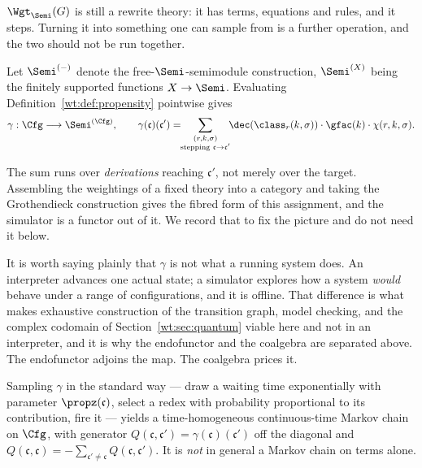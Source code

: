 $\Wgt_{\Semi}(G)$ is still a rewrite theory: it has terms, equations and rules, and it
steps. Turning it into something one can sample from is a further operation, and the two
should not be run together.

\begin{definition}
\label{wt:def:coalgebra}
Let $\Semi^{(-)}$ denote the free-$\Semi$-semimodule construction, $\Semi^{(X)}$ being the
finitely supported functions $X \to \Semi$. Evaluating
Definition~\ref{wt:def:propensity} pointwise gives
\[
  \gamma : \Cfg \longrightarrow \Semi^{(\Cfg)},
  \qquad
  \gamma(\mathfrak{c})(\mathfrak{c}')
  = \!\!\sum_{\substack{(r,k,\sigma) \\ \text{stepping } \mathfrak{c} \to \mathfrak{c}'}}\!\!
    \dec(\class_r(k,\sigma)) \cdot \gfac(k) \cdot \chi(r,k,\sigma).
\]
\end{definition}

The sum runs over \emph{derivations} reaching $\mathfrak{c}'$, not merely over the target.
Assembling the weightings of a fixed theory into a category and taking the Grothendieck
construction gives the fibred form of this assignment, and the simulator is a functor out
of it. We record that to fix the picture and do not need it below.

\begin{remark}
\label{wt:rmk:simulator}
It is worth saying plainly that $\gamma$ is not what a running system does.
An interpreter advances one actual state; a simulator explores how a system \emph{would}
behave under a range of configurations, and it is offline. That difference is what makes
exhaustive construction of the transition graph, model checking, and the complex codomain
of Section~\ref{wt:sec:quantum} viable here and not in an interpreter, and it is why the
endofunctor and the coalgebra are separated above. The endofunctor adjoins the map. The
coalgebra prices it.
\end{remark}

\begin{theorem}
\label{wt:thm:markov}
Sampling $\gamma$ in the standard way --- draw a waiting time exponentially with parameter
$\propz(\mathfrak{c})$, select a redex with probability proportional to its contribution,
fire it --- yields a time-homogeneous continuous-time Markov chain on $\Cfg$, with
generator $Q(\mathfrak{c},\mathfrak{c}') = \gamma(\mathfrak{c})(\mathfrak{c}')$ off the
diagonal and $Q(\mathfrak{c},\mathfrak{c}) = -\sum_{\mathfrak{c}' \neq \mathfrak{c}}
Q(\mathfrak{c},\mathfrak{c}')$. It is \emph{not} in general a Markov chain on terms alone.
\end{theorem}

